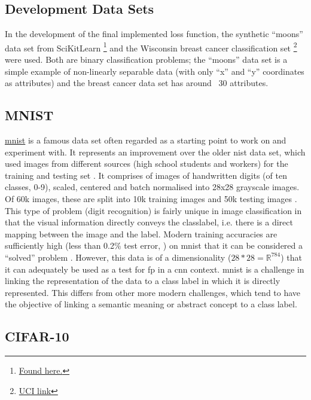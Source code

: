 \subsection{Development Data Sets}

In the development of the final implemented loss function, the synthetic \enquote{moons} data set from SciKitLearn \footnote{\href{https://scikit-learn.org/stable/modules/generated/sklearn.datasets.make_moons.html}{Found here.}} and the Wisconsin breast cancer classification set \cite{uci_ml_data} \footnote{\href{https://archive.ics.uci.edu/ml/datasets/Breast+Cancer+Wisconsin+(Diagnostic)}{UCI link}} were used. Both are binary classification problems; the \enquote{moons} data set is a simple example of non-linearly separable data (with only \enquote{x} and \enquote{y} coordinates as attributes) and the breast cancer data set has around ~30 attributes.

\subsection{MNIST}
 
\href{http://yann.lecun.com/exdb/mnist/}{\gls{mnist}} is a famous data set often regarded as a starting point to work on and experiment with. It represents an improvement over the older \gls{nist} data set, which used images from different sources (high school students and workers) for the training and testing set \cite{nist}. It comprises of images of handwritten digits (of ten classes, 0-9), scaled, centered and batch normalised into 28x28 grayscale images. Of 60k images, these are split into 10k training images and 50k testing images \cite{mnist}. This type of problem (digit recognition) is fairly unique in image classification in that the visual information directly conveys the \gls{classlabel}, i.e. there is a direct mapping between the image and the label. Modern training accuracies are sufficiently high (less than 0.2\% test error, \cite{mnist_sota}) on \gls{mnist} that it can be considered a \enquote{solved} problem \cite{mnist_sota_web}. However, this data is of a dimensionality ($28 * 28 = \mathds{R}^{784}$) that it can adequately be used as a test for \gls{fp} in a \gls{cnn} context. \Gls{mnist} is a challenge in linking the representation of the data to a class label in which it is directly represented. This differs from other more modern challenges, which tend to have the objective of linking a semantic meaning or abstract concept to a class label. 
\bigskip


\subsection{CIFAR-10}

